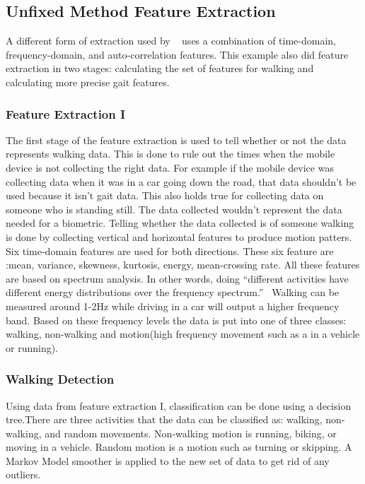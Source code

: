 \documentclass{sig-alternate}
\begin{document}
\subsection{Unfixed Method Feature Extraction}
	A different form of extraction used by ~\cite{Lu:2014} uses a combination of time-domain, frequency-domain, and auto-correlation features. This example also did feature extraction in two stages: calculating the set of features for walking and calculating more precise gait features. 
\subsubsection{Feature Extraction I}
	The first stage of the feature extraction is used to tell whether or not the data represents walking data. This is done to rule out the times when the mobile device is not collecting the right data. For example if the mobile device was collecting data when it was in a car going down the road, that data shouldn't be used because it isn't gait data. This also holds true for collecting data on someone who is standing still. The data collected wouldn't represent the data needed for a biometric. Telling whether the data collected is of someone walking is done by collecting vertical and horizontal features to produce motion patters. Six time-domain features are used for both directions. These six feature are :mean, variance, skewness, kurtosis, energy, mean-crossing rate. All these features are based on spectrum analysis. In other words, doing ``different activities have different energy distributions over the frequency spectrum.''~\cite{Lu:2014} Walking can be measured around 1-2Hz while driving in a car will output a higher frequency band. Based on these frequency levels the data is put into one of three classes: walking, non-walking and motion(high frequency movement such as a in a vehicle or running).~\cite{Muaaz:2013}
\subsubsection{Walking Detection}
	Using data from feature extraction I, classification can be done using a decision tree.There are three activities that the data can be classified as: walking, non-walking, and random movements. Non-walking motion is running, biking, or moving in a vehicle. Random motion is a motion such as turning or skipping. A Markov Model smoother is applied to the new set of data to get rid of any outliers. 
\end{document}
